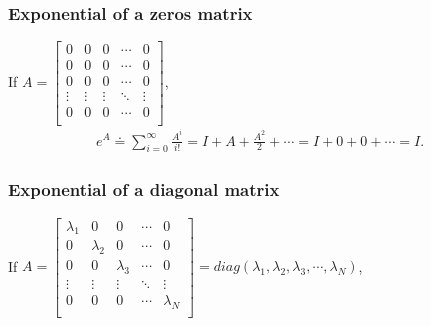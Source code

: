 \documentclass[letterpaper,10pt,english]{jupyterBook}
\begin{document}
\subsubsection{Exponential of a zeros matrix}
\label{\detokenize{cap3:exponential-of-a-zeros-matrix}}
\sphinxAtStartPar
If \(A =   
\left[ {\begin{array}{ccccc}
    0 & 0 & 0 & \dotsm & 0\\
    0 & 0 & 0 & \dotsm & 0\\
    0 & 0 & 0 & \dotsm & 0\\
    \vdots & \vdots & \vdots & \ddots & \vdots\\
    0 & 0 & 0 & \dotsm & 0\\
\end{array} } \right] \),
\begin{equation*}
\begin{split}
    e^A \doteq \sum_{i=0}^{\infty} \frac{A^i}{i!} = I + A + \frac{A^2}{2} + \dotsm = I + 0 + 0 + \dotsm = I.
\end{split}
\end{equation*}

\subsubsection{Exponential of a diagonal matrix}
\label{\detokenize{cap3:exponential-of-a-diagonal-matrix}}
\sphinxAtStartPar
If \(A =   
\left[ {\begin{array}{ccccc}
    \lambda_1 & 0 & 0 & \dotsm & 0\\
    0 & \lambda_2 & 0 & \dotsm & 0\\
    0 & 0 & \lambda_3 & \dotsm & 0\\
    \vdots & \vdots & \vdots & \ddots & \vdots\\
    0 & 0 & 0 & \dotsm & \lambda_{N}\\
\end{array} } \right] 
  = diag(\lambda_1, \lambda_2, \lambda_3, \dotsm, \lambda_N)\),
\end{document}
